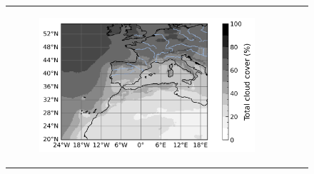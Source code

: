\begin{figure}[htbp]
\begin{tabular}{ccc}
\begin{subfigure}[b]{0.33\textwidth}
            \includegraphics[width=\textwidth]{images/chap4/domain_size/var_map_cldt_ERA5.png}
        \end{subfigure} \\


\end{tabular}
\end{figure}
